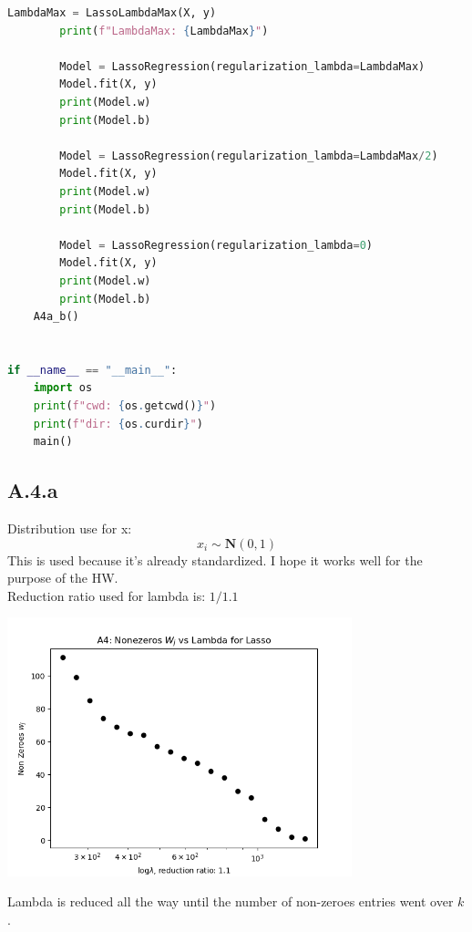 \documentclass[]{article}
\begin{document}
\begin{lstlisting}[language=python]
        LambdaMax = LassoLambdaMax(X, y)
        print(f"LambdaMax: {LambdaMax}")

        Model = LassoRegression(regularization_lambda=LambdaMax)
        Model.fit(X, y)
        print(Model.w)
        print(Model.b)

        Model = LassoRegression(regularization_lambda=LambdaMax/2)
        Model.fit(X, y)
        print(Model.w)
        print(Model.b)

        Model = LassoRegression(regularization_lambda=0)
        Model.fit(X, y)
        print(Model.w)
        print(Model.b)
    A4a_b()


if __name__ == "__main__":
    import os
    print(f"cwd: {os.getcwd()}")
    print(f"dir: {os.curdir}")
    main()
    \end{lstlisting}
    \subsection*{A.4.a}
        Distribution use for x: 
        $$
            x_i \sim \mathbf{N}(0, 1)
        $$
        This is used because it's already standardized. I hope it works well for the purpose of the HW. 
        \\
        Reduction ratio used for lambda is: $1/1.1$
        \begin{center}
            \includegraphics[width=10cm]{A4a-plot.png}
        \end{center}
        Lambda is reduced all the way until the number of non-zeroes entries went over $k$. 
\end{document}
